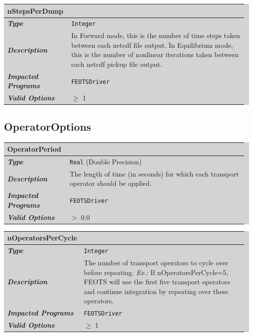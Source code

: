 \documentclass{softwaremanual}
\begin{document}

\noindent\begingroup\setlength{\fboxsep}{0pt}
\colorbox{lightgray}{
\begin{tabular}{p{0.25\linewidth} p{0.725\linewidth}}
\toprule
\textbf{nStepsPerDump} & \\
\midrule
\textbf{\textit{Type}} & \texttt{Integer} \\
\midrule
\textbf{\textit{Description}} & In Forward mode, this is the number of time steps taken between each netcdf file output. In Equilibrium mode, this is the number of nonlinear iterations taken between each netcdf pickup file output. \\
\midrule
\textbf{\textit{Impacted Programs}} & \texttt{FEOTSDriver} \\
\midrule
\textbf{\textit{Valid Options}}  & $\geq$ 1 \\
\bottomrule
\end{tabular}
}\endgroup

\subsection{OperatorOptions}
\noindent\begingroup\setlength{\fboxsep}{0pt}
\colorbox{lightgray}{
\begin{tabular}{p{0.25\linewidth} p{0.725\linewidth}}
\toprule
\textbf{OperatorPeriod} & \\
\midrule
\textbf{\textit{Type}} & \texttt{Real} (Double Precision) \\
\midrule
\textbf{\textit{Description}} & The length of time (in seconds) for which each transport operator should be applied. \\
\midrule
\textbf{\textit{Impacted Programs}} & \texttt{FEOTSDriver} \\
\midrule
\textbf{\textit{Valid Options}}  & $>$ 0.0 \\
\bottomrule
\end{tabular}
}\endgroup


\noindent\begingroup\setlength{\fboxsep}{0pt}
\colorbox{lightgray}{
\begin{tabular}{p{0.25\linewidth} p{0.725\linewidth}}
\toprule
\textbf{nOperatorsPerCycle} & \\
\midrule
\textbf{\textit{Type}} & \texttt{Integer} \\
\midrule
\textbf{\textit{Description}} & The number of transport operators to cycle over before repeating. \textit{Ex.:} If nOperatorsPerCycle=5, FEOTS will use the first five transport operators and continue integration by repeating over these operators. \\
\midrule
\textbf{\textit{Impacted Programs}} & \texttt{FEOTSDriver} \\
\midrule
\textbf{\textit{Valid Options}}  & $\geq$ 1 \\
\bottomrule
\end{tabular}
}\endgroup
\end{document}
